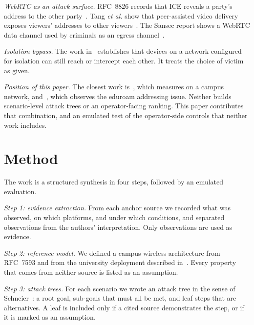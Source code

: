 \documentclass[conference]{IEEEtran}
\begin{document}
\textit{WebRTC as an attack surface.} RFC~8826 records that ICE reveals a party's address to the other party~\cite{rfc8826}. Tang \emph{et al.} show that peer-assisted video delivery exposes viewers' addresses to other viewers~\cite{tang2022}. The Sansec report shows a WebRTC data channel used by criminals as an egress channel~\cite{sansec2026}.

\textit{Isolation bypass.} The work in~\cite{framingframes2023,airsnitch2026} establishes that devices on a network configured for isolation can still reach or intercept each other. It treats the choice of victim as given.

\textit{Position of this paper.} The closest work is~\cite{koysha2025}, which measures on a campus network, and~\cite{nibert2025}, which observes the eduroam addressing issue. Neither builds scenario-level attack trees or an operator-facing ranking. This paper contributes that combination, and an emulated test of the operator-side controls that neither work includes.

\section{Method}
\label{sec:method}
The work is a structured synthesis in four steps, followed by an emulated evaluation.

\textit{Step 1: evidence extraction.} From each anchor source we recorded what was observed, on which platforms, and under which conditions, and separated observations from the authors' interpretation. Only observations are used as evidence.

\textit{Step 2: reference model.} We defined a campus wireless architecture from RFC~7593 and from the university deployment described in~\cite{airsnitch2026}. Every property that comes from neither source is listed as an assumption.

\textit{Step 3: attack trees.} For each scenario we wrote an attack tree in the sense of Schneier~\cite{schneier1999}: a root goal, sub-goals that must all be met, and leaf steps that are alternatives. A leaf is included only if a cited source demonstrates the step, or if it is marked as an assumption.
\end{document}
